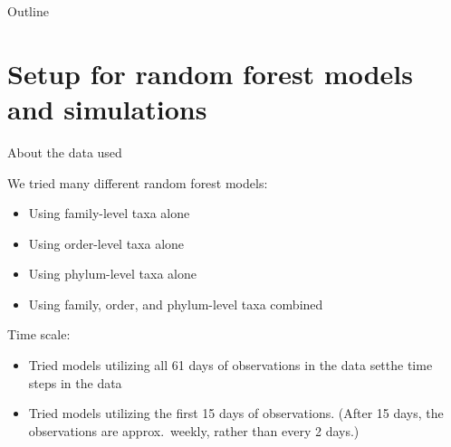 \documentclass{beamer}
\begin{document}

\begin{frame}{Outline}
  \tableofcontents
\end{frame}








\section[Background]{Setup for random forest models and simulations}

\begin{frame}{About the data used}

{\footnotesize
  
\noindent We tried many different random forest models:
\begin{itemize}
\item Using family-level taxa alone
\item Using order-level taxa alone
\item Using phylum-level taxa alone
\item Using family, order, and phylum-level taxa combined
\end{itemize}

\vspace{0.1in}

\noindent Time scale:
\begin{itemize}
\item Tried models utilizing all 61 days of observations in the data setthe time steps in the data
\item Tried models utilizing the first 15 days of observations. (After
  15 days, the observations are approx.~weekly, rather than every 2
  days.)
\end{itemize}
}

\end{frame}
\end{document}
